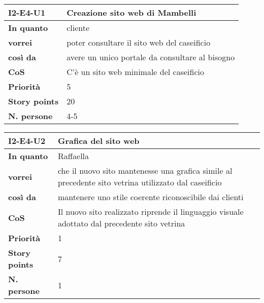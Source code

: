 \begin{table}[H]
  \begin{tabularx}{\textwidth}{lX}
    \toprule
    \textbf{I2-E4-U1} & \textbf{Creazione sito web di Mambelli} \\
    \midrule
    \textbf{In quanto} & cliente \\
    \textbf{vorrei} & poter consultare il sito web del caseificio \\
    \textbf{così da} & avere un unico portale da consultare al bisogno \\
    \midrule
    \textbf{CoS} & C'è un sito web minimale del caseificio \\ 
    \midrule
    \textbf{Priorità} & 5 \\
    \textbf{Story points} & 20 \\
    \textbf{N. persone} & 4-5 \\
    \bottomrule
  \end{tabularx}
  \label{user-story:i2-e4-u1}
\end{table}

\begin{table}[H]
  \begin{tabularx}{\textwidth}{lX}
    \toprule
    \textbf{I2-E4-U2} & \textbf{Grafica del sito web} \\
    \midrule
    \textbf{In quanto} & Raffaella \\
    \textbf{vorrei} & che il nuovo sito mantenesse una grafica simile al precedente sito vetrina utilizzato dal caseificio \\
    \textbf{così da} & mantenere uno stile coerente riconoscibile dai clienti \\
    \midrule
    \textbf{CoS} & Il nuovo sito realizzato riprende il linguaggio visuale adottato dal precedente sito vetrina \\ 
    \midrule
    \textbf{Priorità} & 1 \\
    \textbf{Story points} & 7 \\
    \textbf{N. persone} & 1 \\
    \bottomrule
  \end{tabularx}
  \label{user-story:i2-e4-u2}
\end{table}


